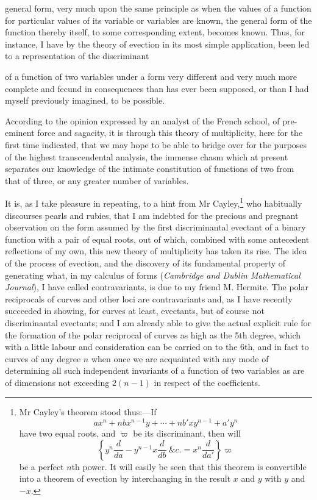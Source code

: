 \documentclass[11pt]{article}
\newcommand{\sourcepage}[1]{\marginpar{\scriptsize p.~#1}}
\begin{document}
{{general form, very much upon the same principle as when the values of a function for particular values of its variable or variables are known, the general form of the function thereby itself, to some corresponding extent, becomes known. Thus, for instance, I have by the theory of evection in its most simple application, been led to a representation of the discriminant

\sourcepage{376}
of a function of two variables under a form very different and very much more complete and fecund in consequences than has ever been supposed, or than I had myself previously imagined, to be possible.

According to the opinion expressed by an analyst of the French school, of pre-eminent force and sagacity, it is through this theory of multiplicity, here for the first time indicated, that we may hope to be able to bridge over for the purposes of the highest transcendental analysis, the immense chasm which at present separates our knowledge of the intimate constitution of functions of two from that of three, or any greater number of variables.

It is, as I take pleasure in repeating, to a hint from Mr Cayley,\footnote{Mr Cayley's theorem stood thus:---If
\[
ax^n+nbx^{n-1}y+\cdots+nb'xy^{n-1}+a'y^n
\]
have two equal roots, and $\varpi$ be its discriminant, then will
\[
\left\{y^n\frac{d}{da}-y^{n-1}x\frac{d}{db}\ \&c.=x^n\frac{d}{da'}\right\}\varpi
\]
be a perfect $n$th power. It will easily be seen that this theorem is convertible into a theorem of evection by interchanging in the result $x$ and $y$ with $y$ and $-x$.} who habitually discourses pearls and rubies, that I am indebted for the precious and pregnant observation on the form assumed by the first discriminantal evectant of a binary function with a pair of equal roots, out of which, combined with some antecedent reflections of my own, this new theory of multiplicity has taken its rise. The idea of the process of evection, and the discovery of its fundamental property of generating what, in my calculus of forms (\emph{Cambridge and Dublin Mathematical Journal}), I have called contravariants, is due to my friend M. Hermite. The polar reciprocals of curves and other loci are contravariants and, as I have recently succeeded in showing, for curves at least, evectants, but of course not discriminantal evectants; and I am already able to give the actual explicit rule for the formation of the polar reciprocal of curves as high as the 5th degree, which with a little labour and consideration can be carried on to the 6th, and in fact to curves of any degree $n$ when once we are acquainted with any mode of determining all such independent invariants of a function of two variables as are of dimensions not exceeding $2(n-1)$ in respect of the coefficients.

}}
\end{document}
